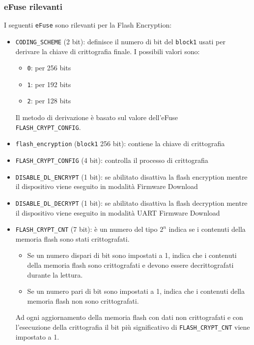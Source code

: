 \documentclass[a4paper]{article}
\begin{document}
\subsubsection{eFuse rilevanti}
I seguenti \texttt{eFuse} sono rilevanti per la Flash Encryption:
\begin{itemize}
  \item \texttt{CODING\_SCHEME} (2 bit): definisce il numero di bit del
    \texttt{block1} usati per derivare la chiave di crittografia finale.
    I possibili valori sono:
    \begin{itemize}
      \item \texttt{0}: per 256 bits
      \item \texttt{1}: per 192 bits
      \item \texttt{2}: per 128 bits
    \end{itemize}
    Il metodo di derivazione è basato sul valore dell'eFuse \\
    \texttt{FLASH\_CRYPT\_CONFIG}.

  \item \texttt{flash\_encryption} (\texttt{block1} 256 bit): contiene la chiave di
    crittografia

  \item \texttt{FLASH\_CRYPT\_CONFIG} (4 bit): controlla il processo di crittografia

  \item \texttt{DISABLE\_DL\_ENCRYPT} (1 bit): se abilitato disattiva la flash encryption
    mentre il dispositivo viene eseguito in modalità Firmware Download

  \item \texttt{DISABLE\_DL\_DECRYPT} (1 bit): se abilitato disattiva la flash decryption
    mentre il dispositivo viene eseguito in modalità UART Firmware Download

  \item \texttt{FLASH\_CRYPT\_CNT} (7 bit): è un numero del tipo \( 2^n \) indica se
    i contenuti della memoria flash sono stati crittografati.
    \begin{itemize}
      \item Se un numero dispari di bit sono impostati a 1, indica che i contenuti
        della memoria flash sono crittografati e devono essere decrittografati durante
        la lettura.

      \item Se un numero pari di bit sono impostati a 1, indica che i contenuti della
        memoria flash non sono crittografati.
    \end{itemize}
    Ad ogni aggiornamento della memoria flash con dati non crittografati e con l'esecuzione
    della crittografia il bit più significativo di \texttt{FLASH\_CRYPT\_CNT} viene
    impostato a 1.
\end{itemize}
\end{document}
